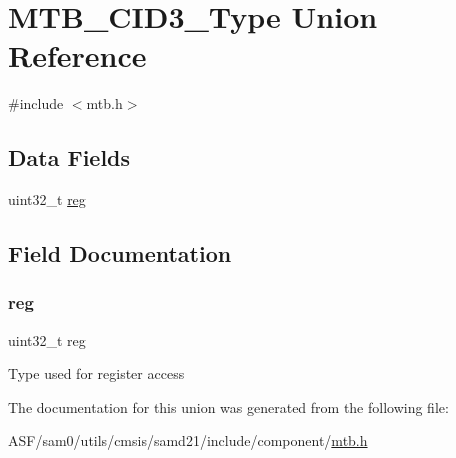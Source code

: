 \hypertarget{union_m_t_b___c_i_d3___type}{}\section{M\+T\+B\+\_\+\+C\+I\+D3\+\_\+\+Type Union Reference}
\label{union_m_t_b___c_i_d3___type}


{\ttfamily \#include $<$mtb.\+h$>$}

\subsection*{Data Fields}
\begin{DoxyCompactItemize}
\item 
uint32\+\_\+t \mbox{\hyperlink{union_m_t_b___c_i_d3___type_a6b91636401516a477989a336376d7b40}{reg}}
\end{DoxyCompactItemize}


\subsection{Field Documentation}
\mbox{\label{union_m_t_b___c_i_d3___type_a6b91636401516a477989a336376d7b40}} 
\subsubsection{\texorpdfstring{reg}{reg}}
{\footnotesize\ttfamily uint32\+\_\+t reg}

Type used for register access 

The documentation for this union was generated from the following file\+:\begin{DoxyCompactItemize}
\item 
A\+S\+F/sam0/utils/cmsis/samd21/include/component/\mbox{\hyperlink{component_2mtb_8h}{mtb.\+h}}\end{DoxyCompactItemize}
